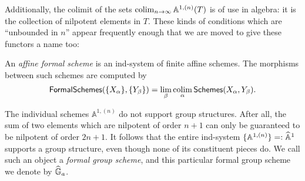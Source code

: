 Additionally, the colimit of the sets $\operatorname*{colim}_{n \to \infty} \mathbb A^{1,(n)}(T)$ is of use in algebra: it is the collection of nilpotent elements in $T$.  These kinds of conditions which are ``unbounded in $n$'' appear frequently enough that we are moved to give these functors a name too:
\begin{definition}
An \textit{affine formal scheme} is an ind-system of finite affine schemes.    The morphisms between such schemes are computed by \[\mathsf{FormalSchemes}(\{X_\alpha\}, \{Y_\beta\}) = \lim_\beta \operatorname*{colim}_\alpha \mathsf{Schemes}(X_\alpha, Y_\beta).\]
\end{definition}


\begin{example}\label{FormalGaExample}
The individual schemes $\mathbb A^{1, (n)}$ do not support group structures.  After all, the sum of two elements which are nilpotent of order $n+1$ can only be guaranteed to be nilpotent of order $2n+1$.  It follows that the entire ind-system $\{\mathbb A^{1, (n)}\} =: \widehat{\mathbb{A}}^1$ supports a group structure, even though none of its constituent pieces do.  We call such an object a \textit{formal group scheme}, and this particular formal group scheme we denote by $\widehat{\mathbb G}_a$.
\end{example}

